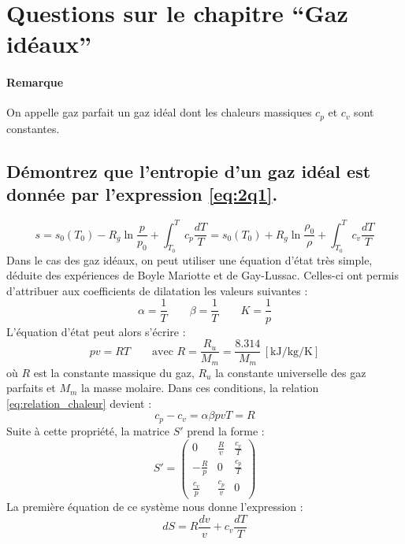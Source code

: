 \section{Questions sur le chapitre ``Gaz idéaux''}
\paragraph{Remarque} On appelle gaz parfait un gaz idéal dont les chaleurs massiques $c_p$ et $c_v$ sont constantes.
\subsection{Démontrez que l'entropie d'un gaz idéal est donnée par l'expression \ref{eq:2q1}.}
\begin{equation} s = s_0(T_0) - R_g\ln{\frac{p}{p_0}} + \int_{T_0}^T c_p\frac{dT}{T} = s_0(T_0) + R_g\ln{\frac{\rho_0}{\rho}} + \int_{T_0}^T c_v\frac{dT}{T} \label{eq:2q1}\end{equation}
Dans le cas des gaz idéaux, on peut utiliser une équation d'état très simple, déduite des expériences de Boyle Mariotte et de Gay-Lussac. Celles-ci ont permis d'attribuer aux coefficients de dilatation les valeurs suivantes :
\begin{equation} \alpha = \frac{1}{T} \qquad \beta = \frac{1}{T} \qquad K = \frac{1}{p} \label{eq:coef_ideaux}\end{equation}
L'équation d'état peut alors s'écrire :
\begin{equation} pv = RT \qquad \text{avec } R = \frac{R_u}{M_m} = \frac{8.314}{M_m} \, \left[\si{\kilo\joule\per\kilo\gram\per\kelvin}\right] \end{equation}
où $R$ est la constante massique du gaz, $R_u$ la constante universelle des gaz parfaits et $M_m$ la masse molaire. Dans ces conditions, la relation \ref{eq:relation_chaleur} devient :
\begin{equation} c_p-c_v = \alpha\beta pvT = R\end{equation}
Suite à cette propriété, la matrice $S'$ prend la forme :
\begin{equation} S' = \begin{pmatrix}0 & \frac{R}{v} & \frac{c_v}{T} \\ -\frac{R}{p} & 0 & \frac{c_p}{T} \\ \frac{c_v}{p} & \frac{c_p}{v} & 0 \end{pmatrix} \label{eq:matriceSideal}\end{equation}
La première équation de ce système nous donne l'expression :
\begin{equation} dS = R\frac{dv}{v} + c_v\frac{dT}{T} \end{equation}
